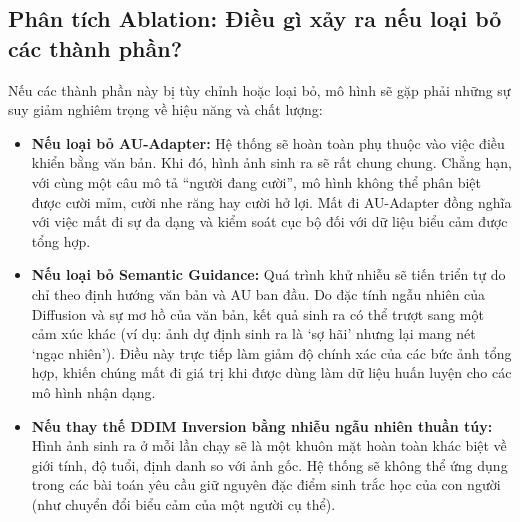 \subsection{Phân tích Ablation: Điều gì xảy ra nếu loại bỏ các thành phần?}

Nếu các thành phần này bị tùy chỉnh hoặc loại bỏ, mô hình sẽ gặp phải những sự suy giảm nghiêm trọng về hiệu năng và chất lượng:
\begin{itemize}
    \item \textbf{Nếu loại bỏ AU-Adapter:} Hệ thống sẽ hoàn toàn phụ thuộc vào việc điều khiển bằng văn bản. Khi đó, hình ảnh sinh ra sẽ rất chung chung. Chẳng hạn, với cùng một câu mô tả ``người đang cười'', mô hình không thể phân biệt được cười mỉm, cười nhe răng hay cười hở lợi. Mất đi AU-Adapter đồng nghĩa với việc mất đi sự đa dạng và kiểm soát cục bộ đối với dữ liệu biểu cảm được tổng hợp.
    \item \textbf{Nếu loại bỏ Semantic Guidance:} Quá trình khử nhiễu sẽ tiến triển tự do chỉ theo định hướng văn bản và AU ban đầu. Do đặc tính ngẫu nhiên của Diffusion và sự mơ hồ của văn bản, kết quả sinh ra có thể trượt sang một cảm xúc khác (ví dụ: ảnh dự định sinh ra là `sợ hãi' nhưng lại mang nét `ngạc nhiên'). Điều này trực tiếp làm giảm độ chính xác của các bức ảnh tổng hợp, khiến chúng mất đi giá trị khi được dùng làm dữ liệu huấn luyện cho các mô hình nhận dạng.
    \item \textbf{Nếu thay thế DDIM Inversion bằng nhiễu ngẫu nhiên thuần túy:} Hình ảnh sinh ra ở mỗi lần chạy sẽ là một khuôn mặt hoàn toàn khác biệt về giới tính, độ tuổi, định danh so với ảnh gốc. Hệ thống sẽ không thể ứng dụng trong các bài toán yêu cầu giữ nguyên đặc điểm sinh trắc học của con người (như chuyển đổi biểu cảm của một người cụ thể).
\end{itemize}
